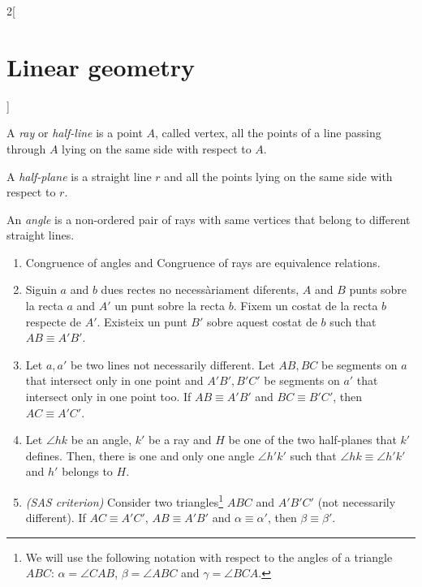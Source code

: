 \documentclass[class=article,10pt,crop=false]{standalone}
\begin{document}
\begin{multicols}{2}[\section{Linear geometry}]
\begin{axiom}
\begin{enumerate}
\end{enumerate}
\end{axiom}
\begin{definition}
A \textit{ray} or \textit{half-line} is a point $A$, called vertex, all the points of a line passing through $A$ lying on the same side with respect to $A$.
\end{definition}
\begin{definition}
A \textit{half-plane} is a straight line $r$ and all the points lying on the same side with respect to $r$.
\end{definition}
\begin{definition}
An \textit{angle} is a non-ordered pair of rays with same vertices that belong to different straight lines.
\end{definition}
\begin{axiom}
\label{3}
\hfill
\begin{enumerate}
    \item Congruence of angles and Congruence of rays are equivalence relations.
    \item Siguin $a$ and $b$ dues rectes no necessàriament diferents, $A$ and $B$ punts sobre la recta $a$ and $A'$ un punt sobre la recta $b$. Fixem un costat de la recta $b$ respecte de $A'$. Existeix un punt $B'$ sobre aquest costat de $b$ such that $AB\equiv A'B'$.
    \item Let $a,a'$ be two lines not necessarily different. Let $AB,BC$ be segments on $a$ that intersect only in one point and $A'B',B'C'$ be segments on $a'$ that intersect only in one point too. If $AB\equiv A'B'$ and $BC\equiv B'C'$, then $AC\equiv A'C'$.
    \item Let $\angle hk$ be an angle, $k'$ be a ray and $H$ be one of the two half-planes that $k'$ defines. Then, there is one and only one angle $\angle h'k'$ such that $\angle hk\equiv\angle h'k'$ and $h'$ belongs to $H$.
    \item \textit{(SAS criterion)} Consider two triangles\footnote{We will use the following notation with respect to the angles of a triangle $ABC$: $\alpha=\angle CAB$, $\beta=\angle ABC$ and $\gamma=\angle BCA$.} $ABC$ and $A'B'C'$ (not necessarily different). If $AC\equiv A'C'$, $AB\equiv A'B'$ and $\alpha\equiv\alpha'$, then $\beta\equiv\beta'$.
\end{enumerate}
\end{axiom}
\begin{axiom}
\label{4}
\hfill
\begin{enumerate}

\end{enumerate}
\end{axiom}
\end{multicols}
\end{document}
